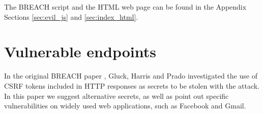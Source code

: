 The BREACH script and the HTML web page can be found in the Appendix Sections
\ref{sec:evil_js} and \ref{sec:index_html}.

\section{Vulnerable endpoints}\label{sec:vulnerabilities}

In the original BREACH paper \cite{breach}, Gluck, Harris and Prado investigated
the use of CSRF tokens included in HTTP responses as secrets to be stolen with
the attack. In this paper we suggest alternative secrets, as well as point out
specific vulnerabilities on widely used web applications, such as Facebook and
Gmail.
